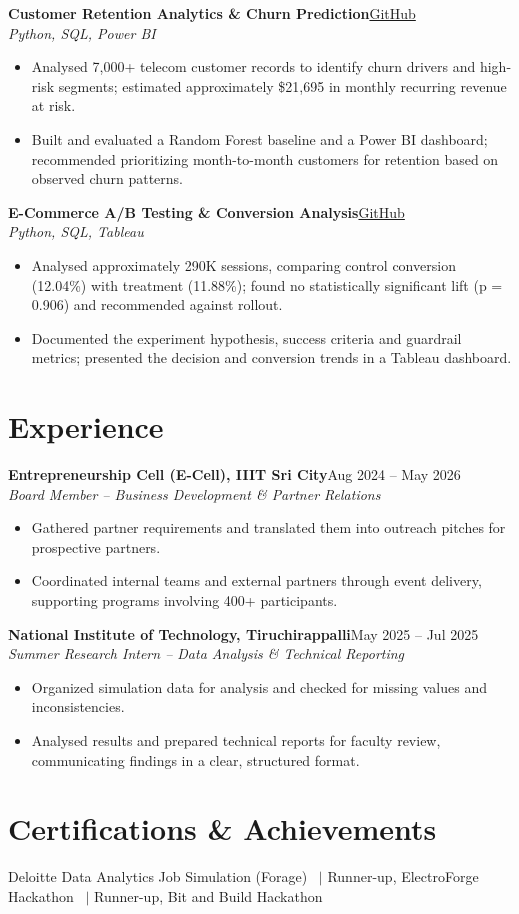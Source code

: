 \documentclass[10pt,a4paper]{article}
\newcommand{\role}[4]{\textbf{#1}\hfill #3\\[-1pt]\textit{#2}\hfill\textit{#4}\vspace{2pt}}
\newcommand{\project}[3]{\textbf{#1}\hfill\href{#3}{GitHub}\\[-1pt]\textit{#2}\vspace{1pt}}
\begin{document}
\project{Customer Retention Analytics \& Churn Prediction}{Python, SQL, Power BI}{https://github.com/06SharXD/Customer-Retention-Analytics-Engine}
\begin{itemize}
\item Analysed 7,000+ telecom customer records to identify churn drivers and high-risk segments; estimated approximately \$21,695 in monthly recurring revenue at risk.
\item Built and evaluated a Random Forest baseline and a Power BI dashboard; recommended prioritizing month-to-month customers for retention based on observed churn patterns.
\end{itemize}

\project{E-Commerce A/B Testing \& Conversion Analysis}{Python, SQL, Tableau}{https://github.com/06SharXD/E-Commerce-AB-Testing-CRO}
\begin{itemize}
\item Analysed approximately 290K sessions, comparing control conversion (12.04\%) with treatment (11.88\%); found no statistically significant lift (p = 0.906) and recommended against rollout.
\item Documented the experiment hypothesis, success criteria and guardrail metrics; presented the decision and conversion trends in a Tableau dashboard.
\end{itemize}

\section{Experience}
\role{Entrepreneurship Cell (E-Cell), IIIT Sri City}{Board Member -- Business Development \& Partner Relations}{Aug 2024 -- May 2026}{}
\begin{itemize}
\item Gathered partner requirements and translated them into outreach pitches for prospective partners.
\item Coordinated internal teams and external partners through event delivery, supporting programs involving 400+ participants.
\end{itemize}

\role{National Institute of Technology, Tiruchirappalli}{Summer Research Intern -- Data Analysis \& Technical Reporting}{May 2025 -- Jul 2025}{}
\begin{itemize}
\item Organized simulation data for analysis and checked for missing values and inconsistencies.
\item Analysed results and prepared technical reports for faculty review, communicating findings in a clear, structured format.
\end{itemize}

\section{Certifications \& Achievements}
Deloitte Data Analytics Job Simulation (Forage) \ $|$ Runner-up, ElectroForge Hackathon \ $|$ Runner-up, Bit and Build Hackathon
\end{document}
